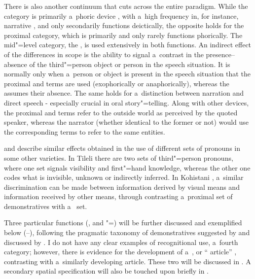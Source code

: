 There is also another continuum that cuts across the entire paradigm. While the  category is primarily a~phoric device \citep[131]{saxena2006}, with a~high frequency in, for instance, narrative , and only secondarily functions deictically, the opposite holds for the proximal category, which is primarily  and only rarely functions phorically. The mid"=level category, the , is used extensively in both functions. An indirect effect of the differences in  scope is the ability to signal a~contrast in the presence--absence of the third"=person object or person in the speech situation. It is normally only when a~person or object is present in the speech situation that the proximal and  terms are used (exophorically or anaphorically), whereas the  assumes their absence. The same holds for a~distinction between narration and direct speech - especially crucial in oral story"=telling. Along with other  devices, the proximal and  terms refer to the outside world as perceived by the quoted speaker, whereas the narrator (whether identical to the former or not) would use the corresponding  terms to refer to the same entities.



\citet[204--205, 207--212]{schmidt2000} and \citet[134--136]{schmidtkohistani2001} describe similar effects obtained in the use of different sets of pronouns in some other \iliShina varieties. In Tileli there are two sets of third"=person pronouns, where one set signals visibility and first"=hand knowledge, whereas the other one codes what is invisible, unknown or indirectly inferred. In Kohistani \iliShina, a~similar discrimination can be made between information derived by visual means and information received by other means, through contrasting a~proximal set of demonstratives with a~ set. 



Three particular functions (,  and "=) will be further discussed and exemplified below (--), following the pragmatic taxonomy of demonstratives suggested by \citet[205--254]{himmelmann1996} and discussed by \citet[432]{diessel2006}. I do not have any clear examples of recognitional use, a~fourth category; however, there is evidence for the development of a~, or `` article'' \citep[486]{juvonen2006}, contrasting with a~similarly developing  article. These two will be discussed in . A secondary spatial specification will also be touched upon briefly in .



